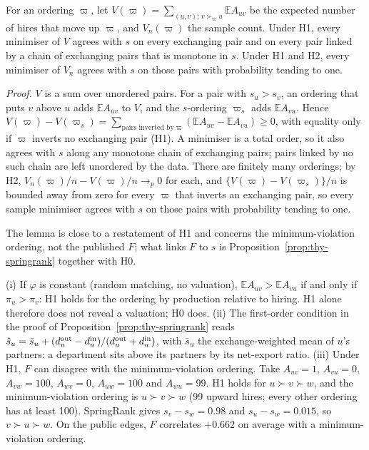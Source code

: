 \begin{thylemma}\label{lem:thy-mvr}
For an ordering $\varpi$, let $V(\varpi)=\sum_{(u,v):\,v\succ_\varpi u}\mathbb EA_{uv}$ be the expected number of hires
that move up $\varpi$, and $V_n(\varpi)$ the sample count. Under H1, every minimiser of $V$ agrees with $s$ on every
exchanging pair and on every pair linked by a chain of exchanging pairs that is monotone in $s$. Under H1 and H2,
every minimiser of $V_n$ agrees with $s$ on those pairs with probability tending to one.
\end{thylemma}

\emph{Proof.} $V$ is a sum over unordered pairs. For a pair with $s_u>s_v$, an ordering that puts $v$ above $u$ adds
$\mathbb EA_{uv}$ to $V$, and the $s$-ordering $\varpi_s$ adds $\mathbb EA_{vu}$. Hence
$V(\varpi)-V(\varpi_s)=\sum_{\text{pairs inverted by }\varpi}(\mathbb EA_{uv}-\mathbb EA_{vu})\ge0$, with equality only
if $\varpi$ inverts no exchanging pair (H1). A minimiser is a total order, so it also agrees with $s$ along any
monotone chain of exchanging pairs; pairs linked by no such chain are left unordered by the data. There are finitely
many orderings; by H2, $V_n(\varpi)/n-V(\varpi)/n\to_p0$ for each, and $\{V(\varpi)-V(\varpi_s)\}/n$ is bounded away
from zero for every $\varpi$ that inverts an exchanging pair, so every sample minimiser
\citep{clauset2015systematic} agrees with $s$ on those pairs with probability tending to one. \thyqed

The lemma is close to a restatement of H1 and concerns the minimum-violation ordering, not the published $F$; what
links $F$ to $s$ is Proposition~\ref{prop:thy-springrank} together with H0.

\begin{thyremark}\label{rem:thy-springrank}
(i) If $\varphi$ is constant (random matching, no valuation), $\mathbb EA_{uv}>\mathbb EA_{vu}$ if and only if
$\pi_u>\pi_v$: H1 holds for the ordering by production relative to hiring. H1 alone therefore does not reveal a
valuation; H0 does. (ii) The first-order condition in the proof of Proposition~\ref{prop:thy-springrank} reads
$\hat s_u=\bar s_u+(d^{\rm out}_u-d^{\rm in}_u)/(d^{\rm out}_u+d^{\rm in}_u)$, with $\bar s_u$ the exchange-weighted
mean of $u$'s partners: a department sits above its partners by its net-export ratio. (iii) Under H1, $F$ can
disagree with the minimum-violation ordering. Take $A_{uv}=1$, $A_{vu}=0$, $A_{vw}=100$, $A_{wv}=0$, $A_{uw}=100$
and $A_{wu}=99$. H1 holds for $u\succ v\succ w$, and the minimum-violation ordering is $u\succ v\succ w$ (99 upward
hires; every other ordering has at least 100). SpringRank gives $s_v-s_w=0.98$ and $s_u-s_w=0.015$, so
$v\succ u\succ w$. On the public edges, $F$ correlates $+0.662$ on average with a minimum-violation ordering.
\end{thyremark}

